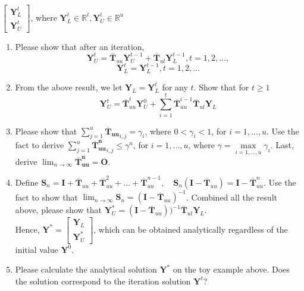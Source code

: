 \documentclass{article}
\begin{document}
$\begin{bmatrix}
\boldsymbol{Y}^{t}_L \\
\boldsymbol{Y}^{t}_U
\end{bmatrix}$, where $\boldsymbol{Y}^{t}_L \in \mathbb{R}^{l}, \boldsymbol{Y}^{t}_U \in \mathbb{R}^{u}$

\begin{enumerate}[resume]
\item Please show that after an iteration,
$$ \boldsymbol{Y}^{t}_U = \boldsymbol{\overline{T}}_{uu} \boldsymbol{Y}^{t-1}_U + \boldsymbol{\overline{T}}_{ul} \boldsymbol{Y}^{t-1}_L, t = 1,2,...,$$
$$\boldsymbol{Y}^{t}_L =  \boldsymbol{Y}^{t-1}_L, t = 1, 2,...$$
\item From the above result, we let $\boldsymbol{Y}_L=\boldsymbol{Y}^{t}_L$ for any $t$. Show that for $t \geq 1$ 
$$ \boldsymbol{Y}^{t}_U = \boldsymbol{\overline{T}}_{uu}^t \boldsymbol{Y}_U^{0} + \sum_{i=1}^t \boldsymbol{\overline{T}}_{uu}^{i-1} \boldsymbol{\overline{T}}_{ul} \boldsymbol{Y}_L$$

\item Please show that $\sum_{j=1}^u \boldsymbol{\overline{T}_{uu}}_{i,j} = \gamma_i$, where $0 < \gamma_i < 1$, for $i=1,...,u$. Use the fact to derive $\sum_{j=1}^u  \boldsymbol{\overline{T}_{uu}^n}_{i,j} \leq \gamma^n$, for $ i=1,...,u$, where $\gamma = \max\limits_{i=1,...,u} \gamma_i $. Last, derive $\lim_{n\to\infty} \boldsymbol{\overline{T}_{uu}^n} = \boldsymbol{O}$.


\item Define $\boldsymbol{S}_n = \boldsymbol{I} + \boldsymbol{\overline{T}}_{uu} + \boldsymbol{\overline{T}}_{uu}^2 + ... + \boldsymbol{\overline{T}}_{uu}^{n-1}, \quad \boldsymbol{S}_n(\boldsymbol{I}-\boldsymbol{\overline{T}}_{uu}) = \boldsymbol{I} - \boldsymbol{\overline{T}}_{uu}^{n}$. Use the fact to show that  
$\lim_{n\to\infty}\boldsymbol{S}_n = (\boldsymbol{I}-\boldsymbol{\overline{T}}_{uu})^{-1}$. Combined all the result above, please show that $\boldsymbol{Y}^{*}_U = (\boldsymbol{I}-\boldsymbol{\overline{T}}_{uu}))^{-1}\boldsymbol{\overline{T}}_{ul} \boldsymbol{Y}_L$. \\
Hence, $\boldsymbol{Y}^{*}=
\begin{bmatrix}
\boldsymbol{Y}_L \\
\boldsymbol{Y}^{*}_U
\end{bmatrix}
$, which can be obtained analytically regardless of the initial value $\boldsymbol{Y}^0$.

\item Please calculate the analytical solution $\boldsymbol{Y}^{*}$ on the toy example above. Does the solution correspond to the iteration solution $\boldsymbol{Y}^{t}$?
\end{enumerate}
\end{document}
